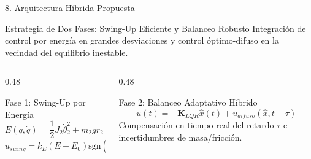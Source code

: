 \documentclass[10pt,aspectratio=169]{beamer}
\begin{document}
\begin{frame}{8. Arquitectura Híbrida Propuesta}
  \begin{block}{Estrategia de Dos Fases: Swing-Up Eficiente y Balanceo Robusto}
    Integración de control por energía en grandes desviaciones y control óptimo-difuso en la vecindad del equilibrio inestable.
  \end{block}

  \vspace{0.2cm}
  \begin{columns}[T]
    \begin{column}{0.48\textwidth}
      \begin{exampleblock}{Fase 1: Swing-Up por Energía}
        \begin{equation*}
          E(q, \dot{q}) = \frac{1}{2} J_2 \dot{\theta}_2^2 + m_2 g r_2 (1 - \cos\theta_2)
        \end{equation*}
        $u_{swing} = k_E (E - E_0) \text{sgn}(\dot{\theta}_2 \cos\theta_1)$
      \end{exampleblock}
    \end{column}
    \begin{column}{0.48\textwidth}
      \begin{exampleblock}{Fase 2: Balanceo Adaptativo Híbrido}
        \begin{equation*}
          u(t) = -\mathbf{K}_{LQR} \hat{x}(t) + u_{difuso}(\hat{x}, t - \tau)
        \end{equation*}
        Compensación en tiempo real del retardo $\tau$ e incertidumbres de masa/fricción.
      \end{exampleblock}
    \end{column}
  \end{columns}
\end{frame}
\end{document}
